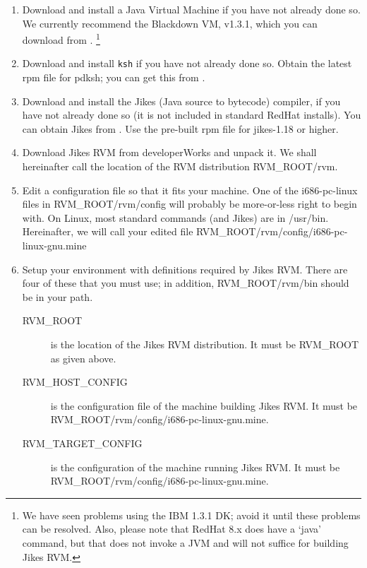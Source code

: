 \begin{enumerate}

\item Download and install a Java Virtual Machine if you have not
already done so.  We currently recommend the Blackdown VM, v1.3.1,
which you can download from \xlink{{\tt \BlackdownURL}}
{\BlackdownURL}. \footnote{We have seen problems using the IBM 1.3.1
DK; avoid it until these problems can be resolved. Also, please note
that RedHat 8.x does have a `java' command, but that does not invoke a
JVM and will not suffice for building Jikes RVM.}

\item Download and install {\tt ksh} if you have not already done so.
Obtain the latest rpm file for pdksh; you can get this from
. 

\item Download and install the Jikes (Java source to bytecode)
compiler, if you have not already 
done so (it is not included in standard RedHat installs).  You can
obtain Jikes from .
Use the pre-built rpm file for jikes-1.18 or higher.

\item Download Jikes RVM from developerWorks and unpack it.  We shall
hereinafter call the location of the RVM distribution RVM\_ROOT/rvm.

\item Edit a configuration file so that it fits your machine.  One of
the i686-pc-linux files in RVM\_ROOT/rvm/config will probably be
more-or-less right to begin with.  On Linux, most standard commands
(and Jikes) are in /usr/bin.  Hereinafter, we will call your edited
file RVM\_ROOT/rvm/config/i686-pc-linux-gnu.mine

\item Setup your environment with definitions required by Jikes RVM.
There are four of these that you must use; in addition,
RVM\_ROOT/rvm/bin should be in your path.
\begin{description}

\item[RVM\_ROOT] is the location of the Jikes RVM distribution.  It
must be RVM\_ROOT as given above.

\item[RVM\_HOST\_CONFIG] is the configuration file of the machine
building Jikes RVM.  It must be
RVM\_ROOT/rvm/config/i686-pc-linux-gnu.mine.

\item[RVM\_TARGET\_CONFIG] is the configuration of the machine running
Jikes RVM.  It must be RVM\_ROOT/rvm/config/i686-pc-linux-gnu.mine.


\end{description}
\end{enumerate}
